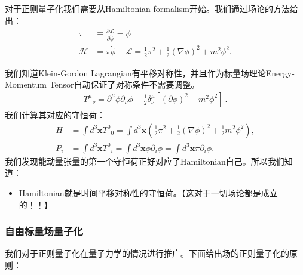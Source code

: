 \bigskip
{}


对于正则量子化我们需要从Hamiltonian formalism开始。我们通过场论的方法给出：
\begin{align}
  \pi&\equiv\frac{\partial\mathcal{L}}{\partial\dot{\phi}}=\dot{\phi} \\
  \mathcal{H}&=\pi\dot{\phi}-\mathcal{L}=\frac{1}{2}\pi^2+\frac{1}{2}\left(\nabla\phi\right)^2+m^2\phi^2.
\end{align}

\bigskip
{}

我们知道Klein-Gordon Lagrangian有平移对称性，并且作为标量场理论Energy-Momentum Tensor自动保证了对称条件不需要调整。
\begin{align}
  T^\mu{}_\nu=\partial^\mu\phi\partial_\nu\phi-\frac{1}{2}\delta_\nu^\mu\left[(\partial\phi)^2-m^2\phi^2\right]\mathrm{~.}
\end{align}
我们计算其对应的守恒荷：
\begin{align}
  H&=\int d^3\mathbf{x}T^0{}_0=\int
  d^3\mathbf{x}\left(\frac{1}{2}\pi^2+\frac{1}{2}(\nabla\phi)^2+\frac{1}{2}m^2\phi^2\right),\\
  P_i&=\int d^3\mathbf{x}T^0{}_i=\int
  d^3\mathbf{x}\dot{\phi}\partial_i\phi=\int d^3\mathbf{x}\pi\partial_i\phi.
\end{align}
我们发现能动量张量的第一个守恒荷正好对应了Hamiltonian自己。所以我们知道：
\begin{itemize}
  \item Hamiltonian就是时间平移对称性的守恒荷。【这对于一切场论都是成立的！！】
\end{itemize}

\subsubsection{自由标量场量子化}


我们对于正则量子化在量子力学的情况进行推广。下面给出场的正则量子化的原则：

